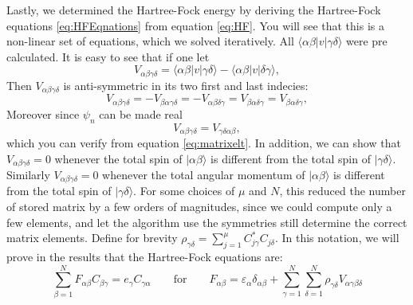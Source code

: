 \documentclass[11pt,english,a4paper]{article}
\begin{document}
Lastly, we determined the Hartree-Fock energy by deriving the Hartree-Fock equations \eqref{eq:HFEqnations} from equation \ref{eq:HF}. You will see that this is a non-linear set of equations, which we solved iteratively. All $\langle \alpha \beta | v  |  \gamma \delta \rangle$ were pre calculated. It is easy to see that if one let 
\[
V_{  \alpha \beta \gamma \delta} = \langle \alpha \beta | v  |  \gamma \delta \rangle - \langle \alpha \beta | v |  \delta \gamma \rangle,
\]
Then $V_{  \alpha \beta \gamma \delta}$ is anti-symmetric in its two first and last indecies:
\[
V_{  \alpha \beta \gamma \delta} = -V_{  \beta\alpha  \gamma \delta} = -V_{  \alpha \beta \delta \gamma } = V_{  \beta \alpha \delta\gamma } = V_{  \beta \alpha \delta\gamma },
\]
Moreover since $\psi_n$ can be made real
\[
V_{  \alpha \beta \gamma \delta} = V_{  \gamma \delta\alpha \beta},
\]
which you can verify from equation \eqref{eq:matrixelt}. In addition, we can show that $V_{  \alpha \beta \gamma \delta} = 0$ whenever the total spin of $ |  \alpha \beta \rangle $ is different from the total spin of $ |  \gamma  \delta \rangle $. Similarly $V_{  \alpha \beta \gamma \delta} = 0$ whenever the total angular momentum of $ |  \alpha \beta \rangle $ is different from the total spin of $ |  \gamma  \delta \rangle$. For some choices of $\mu$ and $N$, this reduced the number of stored matrix by a few orders of magnitudes, since we could compute only a few elements, and let the algorithm use the symmetries still determine the correct matrix elements. Define for brevity $\rho_{ \gamma \delta} = \sum_{j=1}^\mu C_{  j \gamma}^* C_{  j \delta}$. In this notation, we will prove in the results that the Hartree-Fock equations are:
\begin{equation}
\sum_{  \beta = 1}^N F_{  \alpha \beta} C_{  \beta \gamma} = e_\gamma C_{  \gamma \alpha} \qquad \text{for} \qquad F_{  \alpha \beta} = \varepsilon_{  \alpha} \delta_{  \alpha \beta} + \sum_{  \gamma = 1}^N \sum_{  \delta = 1}^N  \rho_{ \gamma \delta}V_{  \alpha \gamma \beta \delta} \label{eq:HFEqnations}
\end{equation}
\end{document}
